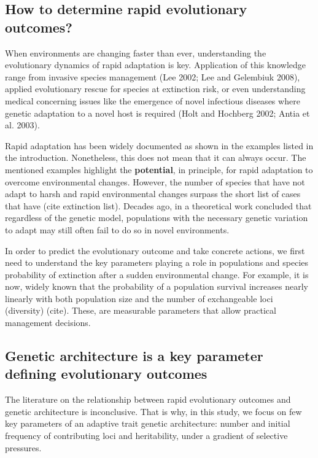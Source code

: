 \documentclass{article}
\begin{document}
\subsection{How to determine rapid evolutionary outcomes?}

When environments are changing faster than ever, understanding the evolutionary dynamics of rapid adaptation is key. Application of this knowledge range from  invasive species management (Lee 2002; Lee and Gelembiuk 2008), applied evolutionary rescue for species at extinction risk, or even understanding medical concerning issues like the emergence of novel infectious diseases where genetic adaptation to a novel host is required (Holt and Hochberg 2002; Antia et al. 2003).

Rapid adaptation has been widely documented as shown in the examples listed in the introduction. Nonetheless, this does not mean that it can always occur. The mentioned examples highlight the \textbf{potential}, in principle, for rapid adaptation to overcome environmental changes. However, the number of species that have not adapt to harsh and rapid environmental changes surpass the short list of cases that have (cite extinction list). Decades ago, in a theoretical work \citep{Gomulkiewicz1995-sj} concluded that regardless of the genetic model, populations with the necessary genetic variation to adapt may still often fail to do so in novel environments. 

In order to predict the evolutionary outcome and take concrete actions, we first need to understand the key parameters playing a role in populations and species probability of extinction after a sudden environmental change. For example, it is now, widely known that the  probability  of  a population  survival  increases  nearly  linearly  with  both  population  size  and  the number of exchangeable loci (diversity) (cite). These, are measurable parameters that allow practical management decisions. 

\subsection{Genetic architecture is a key parameter defining evolutionary outcomes}

The literature on the relationship between rapid evolutionary outcomes and genetic architecture is inconclusive. That is why,  in this study, we focus on few key parameters of an adaptive trait genetic architecture: number and initial frequency of contributing loci and heritability, under a gradient of selective pressures. 
\end{document}
